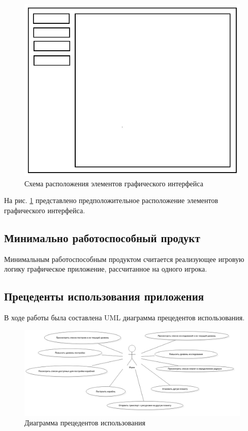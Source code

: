 \begin{figure}[H]
\centering
\includegraphics[scale=0.5]{sc.jpg}
\caption{Схема расположения элементов графического интерфейса}
\label{sc}
\end{figure}

На рис. \ref{sc} представлено предположительное расположение элементов графического интерфейса.

\subsection{Минимально работоспособный продукт}
Минимальным работоспособным продуктом считается реализующее игровую логику графическое приложение, рассчитанное на одного игрока.

\subsection{Прецеденты использования приложения}

В ходе работы была составлена UML диаграмма прецедентов использования.

\begin{figure}[H]
	\begin{center}
		\includegraphics[scale=0.35]{../../uml/UseCaseDiagram1.png}
		\caption{Диаграмма прецедентов использования}
		\label{pic:use_case}
	\end{center}
\end{figure}

